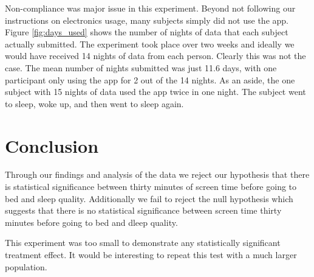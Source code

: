 \documentclass[12pt,]{article}
\begin{document}
Non-compliance was major issue in this experiment. Beyond not following
our instructions on electronics usage, many subjects simply did not use
the app. Figure \ref{fig:days_used} shows the number of nights of data
that each subject actually submitted. The experiment took place over two
weeks and ideally we would have received 14 nights of data from each
person. Clearly this was not the case. The mean number of nights
submitted was just 11.6 days, with one participant only using the app
for 2 out of the 14 nights. As an aside, the one subject with 15 nights
of data used the app twice in one night. The subject went to sleep, woke
up, and then went to sleep again.

\hypertarget{conclusion}{%
\section{Conclusion}\label{conclusion}}

Through our findings and analysis of the data we reject our hypothesis
that there is statistical significance between thirty minutes of screen
time before going to bed and sleep quality. Additionally we fail to
reject the null hypothesis which suggests that there is no statistical
significance between screen time thirty minutes before going to bed and
dleep quality.

This experiment was too small to demonstrate any statistically
significant treatment effect. It would be interesting to repeat this
test with a much larger population.
\end{document}
